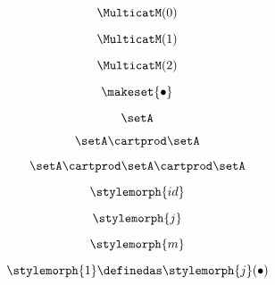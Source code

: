 {\begin{forslides}
        \begin{equation}
            \label{eq:slides_multicategories_33}
            \MulticatM(0)
        \end{equation}

        \begin{equation}
            \label{eq:slides_multicategories_34}
            \MulticatM(1)
        \end{equation}

        \begin{equation}
            \label{eq:slides_multicategories_35}
            \MulticatM(2)
        \end{equation}

        \begin{equation}
            \label{eq:slides_multicategories_36}
            \makeset{ \bullet }
        \end{equation}

        \begin{equation}
            \label{eq:slides_multicategories_37}
            \setA
        \end{equation}

        \begin{equation}
            \label{eq:slides_multicategories_38}
            \setA \cartprod \setA
        \end{equation}

        \begin{equation}
            \label{eq:slides_multicategories_39}
            \setA \cartprod \setA \cartprod \setA
        \end{equation}

        \begin{equation}
            \label{eq:slides_multicategories_40}
            \stylemorph{id}
        \end{equation}

        \begin{equation}
            \label{eq:slides_multicategories_41}
            \stylemorph{j}
        \end{equation}

        \begin{equation}
            \label{eq:slides_multicategories_42}
            \stylemorph{m}
        \end{equation}

        \begin{equation}
            \label{eq:slides_multicategories_43}
            \stylemorph{1} \definedas \stylemorph{j}(\bullet)
        \end{equation}


\end{forslides}}
